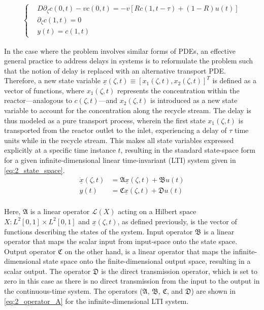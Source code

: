 \begin{align} \label{eq:2_BC}
    \begin{cases}
        &D \partial_\zeta c(0, t) - v c(0, t) = -v \left[ R c(1, t-\tau) + (1-R) u(t) \right] \\
        &\partial_\zeta c(1, t) = 0 \\
        &y(t) = c(1, t)
    \end{cases}
\end{align}

In the case where the problem involves similar forms of PDEs, an effective general practice to address delays in systems is to reformulate the problem such that the notion of delay is replaced with an alternative transport PDE. Therefore, a new state variable $\underline{x}(\zeta, t) \equiv [x_1(\zeta, t), x_2(\zeta, t)]^T$ is defined as a vector of functions, where $x_1(\zeta, t)$ represents the concentration within the reactor—analogous to $c(\zeta,t)$—and $x_2(\zeta, t)$ is introduced as a new state variable to account for the concentration along the recycle stream. The delay is thus modeled as a pure transport process, wherein the first state $x_1(\zeta, t)$ is transported from the reactor outlet to the inlet, experiencing a delay of $\tau$ time units while in the recycle stream. This makes all state variables expressed explicitly at a specific time instance $t$, resulting in the standard state-space form for a given infinite-dimensional linear time-invariant (LTI) system given in \eqref{eq:2_state_space}.
\begin{equation} \label{eq:2_state_space}
    \begin{aligned}
        \dot{\underline{x}}(\zeta, t) &= \mathfrak{A} \underline{x}(\zeta, t) + \mathfrak{B} u(t) \\
        y(t) &= \mathfrak{C} \underline{x}(\zeta, t) + \mathfrak{D} u(t) \\
    \end{aligned}
\end{equation}

Here, $\mathfrak{A}$ is a linear operator $\mathcal{L}(X)$ acting on a Hilbert space $X: L^2[0,1] \times L^2[0,1]$ and $\underline{x}(\zeta,t)$, as defined previously, is the vector of functions describing the states of the system. Input operator $\mathfrak{B}$ is a linear operator that maps the scalar input from input-space onto the state space. Output operator $\mathfrak{C}$ on the other hand, is a linear operator that maps the infinite-dimensional state space onto the finite-dimensional output space, resulting in a scalar output. The operator $\mathfrak{D}$ is the direct transmission operator, which is set to zero in this case as there is no direct transmission from the input to the output in the continuous-time system. The operators ($\mathfrak{A}$, $\mathfrak{B}$, $\mathfrak{C}$, and $\mathfrak{D}$) are shown in \eqref{eq:2_operator_A} for the infinite-dimensional LTI system.

